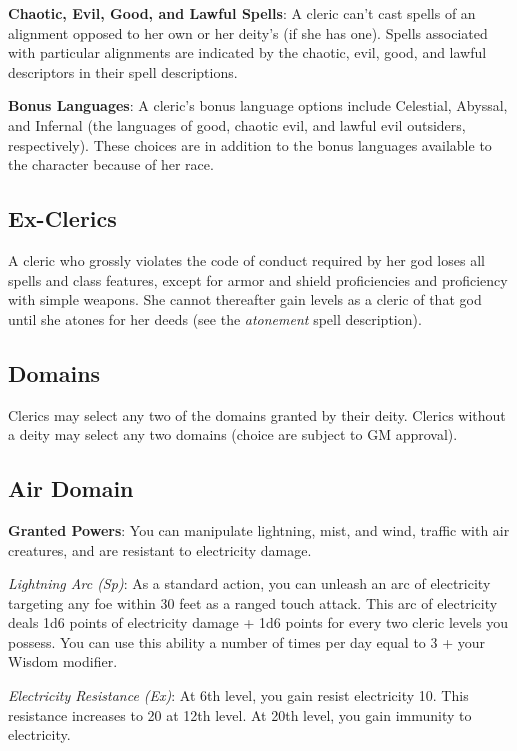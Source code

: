 \textbf{Chaotic, Evil, Good, and Lawful Spells}: A cleric can't cast spells of an alignment opposed to her own or her deity's (if she has one). Spells associated with particular alignments are indicated by the chaotic, evil, good, and lawful descriptors in their spell descriptions.
				
\textbf{Bonus Languages}: A cleric's bonus language options include Celestial, Abyssal, and Infernal (the languages of good, chaotic evil, and lawful evil outsiders, respectively). These choices are in addition to the bonus languages available to the character because of her race.
				
\subsection{Ex-Clerics}

				
A cleric who grossly violates the code of conduct required by her god loses all spells and class features, except for armor and shield proficiencies and proficiency with simple weapons. She cannot thereafter gain levels as a cleric of that god until she atones for her deeds (see the \textit{atonement} spell description).
				
\subsection{Domains}

				
Clerics may select any two of the domains granted by their deity. Clerics without a deity may select any two
domains (choice are subject to GM approval).
				
\subsection{Air Domain}

				
\textbf{Granted Powers}: You can manipulate lightning, mist, and wind, traffic with air creatures, and are
resistant to electricity damage.
				
\textit{Lightning Arc (Sp)}: As a standard action, you can unleash an arc of electricity targeting any foe
within 30 feet as a ranged touch attack. This arc of electricity deals 1d6 points of electricity damage + 1d6
points for every two cleric levels you possess. You can use this ability a number of times per day equal to 
3 + your Wisdom modifier. 

\textit{Electricity Resistance (Ex)}: At 6th level, you gain resist electricity 10. This resistance increases
to 20 at 12th level. At 20th level, you gain immunity to electricity.
				
